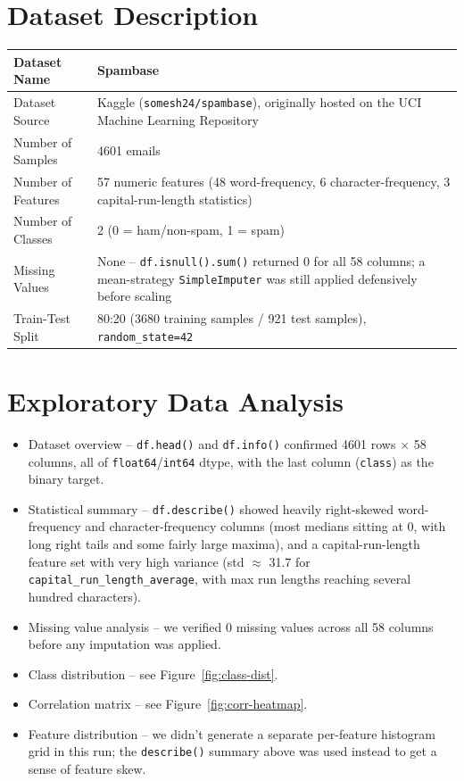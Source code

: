 \documentclass[12pt,a4paper]{article}
\begin{document}
\section{Dataset Description}
\begin{longtable}{|p{6cm}|p{8cm}|}
\hline
Dataset Name & Spambase \\ \hline
Dataset Source & Kaggle (\texttt{somesh24/spambase}), originally hosted on the UCI
Machine Learning Repository \\ \hline
Number of Samples & 4601 emails \\ \hline
Number of Features & 57 numeric features (48 word-frequency, 6 character-frequency,
3 capital-run-length statistics) \\ \hline
Number of Classes & 2 (0 = ham/non-spam, 1 = spam) \\ \hline
Missing Values & None -- \texttt{df.isnull().sum()} returned 0 for all 58 columns;
a mean-strategy \texttt{SimpleImputer} was still applied defensively before scaling \\ \hline
Train-Test Split & 80:20 (3680 training samples / 921 test samples),
\texttt{random\_state=42} \\ \hline
\end{longtable}
 
\section{Exploratory Data Analysis}
\begin{itemize}
\item Dataset overview -- \texttt{df.head()} and \texttt{df.info()} confirmed 4601
rows $\times$ 58 columns, all of \texttt{float64}/\texttt{int64} dtype, with the last
column (\texttt{class}) as the binary target.
\item Statistical summary -- \texttt{df.describe()} showed heavily right-skewed
word-frequency and character-frequency columns (most medians sitting at 0, with long
right tails and some fairly large maxima), and a capital-run-length feature set with
very high variance (std $\approx$ 31.7 for \texttt{capital\_run\_length\_average},
with max run lengths reaching several hundred characters).
\item Missing value analysis -- we verified 0 missing values across all 58 columns
before any imputation was applied.
\item Class distribution -- see Figure~\ref{fig:class-dist}.
\item Correlation matrix -- see Figure~\ref{fig:corr-heatmap}.
\item Feature distribution -- we didn't generate a separate per-feature histogram grid
in this run; the \texttt{describe()} summary above was used instead to get a sense of
feature skew.
\end{itemize}
 
\end{document}
